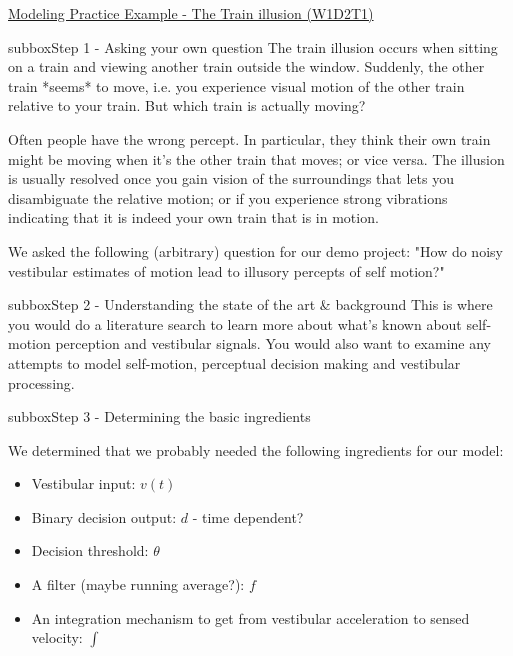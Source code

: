 \begin{textbox}{\href{https://compneuro.neuromatch.io/tutorials/W1D2_ModelingPractice/W1D2_Intro.html}{Modeling Practice Example - The Train illusion (W1D2T1)} }
\begin{subbox}{subbox}{Step 1 - Asking your own question}
\scriptsize
The train illusion occurs when sitting on a train and viewing another train outside the window. Suddenly, the other train *seems* to move, i.e. you experience visual motion of the other train relative to your train. But which train is actually moving?

Often people have the wrong percept. In particular, they think their own train might be moving when it's the other train that moves; or vice versa. The illusion is usually resolved once you gain vision of the surroundings that lets you disambiguate the relative motion; or if you experience strong vibrations indicating that it is indeed your own train that is in motion.


We asked the following (arbitrary) question for our demo project: "How do noisy vestibular estimates of motion lead to illusory percepts of self motion?"



\end{subbox}
\begin{subbox}{subbox}{Step 2  - Understanding the state of the art \& background}
\scriptsize
 This is where you would do a literature search to learn more about what's known about self-motion perception and vestibular signals. You would also want to examine any attempts to model self-motion, perceptual decision making and vestibular processing.

\end{subbox}
\begin{subbox}{subbox}{Step 3 - Determining the basic ingredients  }
\scriptsize

We determined that we probably needed the following ingredients for our model:
\begin{itemize}
    \item 
 Vestibular input: $v(t)$
\item
 Binary decision output: $d$ - time dependent?
\item
 Decision threshold: $\theta$
\item
 A filter (maybe running average?): $f$
\item
 An integration mechanism to get from vestibular acceleration to sensed velocity: $\int$
 \end{itemize}


\end{subbox}
\end{textbox}
